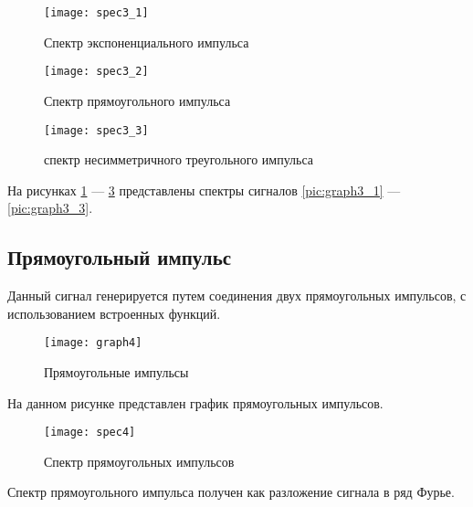 \begin{figure}[H]
	\begin{center}
		\texttt{[image: spec3\_1]}
		\caption{Спектр экспоненциального импульса} 
		\label{pic:spec3_1} %
	\end{center}
\end{figure}
\begin{figure}[H]
	\begin{center}
		\texttt{[image: spec3\_2]}
		\caption{Спектр прямоугольного импульса} 
		\label{pic:spec3_2} %
	\end{center}
\end{figure}
\begin{figure}[H]
	\begin{center}
		\texttt{[image: spec3\_3]}
		\caption{спектр несимметричного треугольного импульса} 
		\label{pic:spec3_3} %
	\end{center}
\end{figure}
На рисунках  \ref{pic:spec3_1} — \ref{pic:spec3_3} представлены спектры сигналов \ref{pic:graph3_1} — \ref{pic:graph3_3}.

\subsection{Прямоугольный импульс}


\parindent=1cm
Данный сигнал генерируется путем соединения двух прямоугольных импульсов, с использованием встроенных функций.

\begin{figure}[H]
	\begin{center}
		\texttt{[image: graph4]}
		\caption{Прямоугольные импульсы} 
		\label{pic:graph4} %
	\end{center}
\end{figure}
На данном рисунке представлен график прямоугольных импульсов.

\begin{figure}[H]
	\begin{center}
		\texttt{[image: spec4]}
		\caption{Спектр прямоугольных импульсов} 
		\label{pic:spec4} %
	\end{center}
\end{figure}
Спектр прямоугольного импульса получен как разложение сигнала в ряд Фурье.

